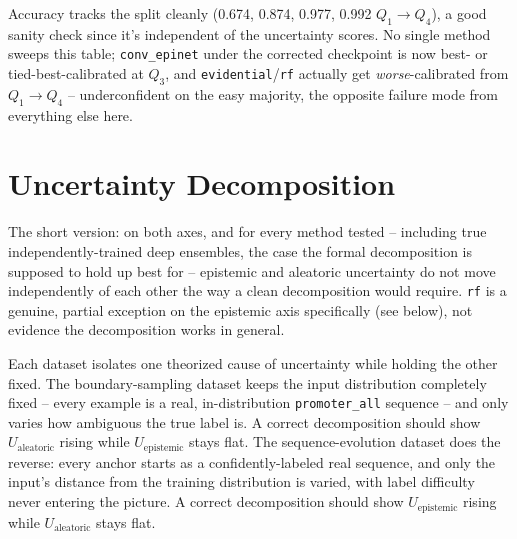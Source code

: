 Accuracy tracks the split cleanly (0.674, 0.874, 0.977, 0.992
$Q_1\to Q_4$), a good sanity check since it's independent of the
uncertainty scores. No single method sweeps this table; \texttt{conv\_epinet}
under the corrected checkpoint is now best- or tied-best-calibrated at $Q_3$,
and \texttt{evidential}/\texttt{rf} actually get \emph{worse}-calibrated
from $Q_1\to Q_4$ -- underconfident on the easy majority, the opposite
failure mode from everything else here.

\section{Uncertainty Decomposition}
\label{sec:discussion-decomposition}

The short version: on both axes, and for every method tested -- including
true independently-trained deep ensembles, the case the formal decomposition
is supposed to hold up best for -- epistemic and aleatoric uncertainty do
not move independently of each other the way a clean decomposition would
require. \texttt{rf} is a genuine, partial exception on the epistemic axis
specifically (see below), not evidence the decomposition works in general.

Each dataset isolates one theorized cause of uncertainty while holding the
other fixed. The boundary-sampling dataset keeps the input distribution
completely fixed -- every example is a real, in-distribution
\texttt{promoter\_all} sequence -- and only varies how ambiguous the true
label is. A correct decomposition should show $U_{\text{aleatoric}}$ rising
while $U_{\text{epistemic}}$ stays flat. The sequence-evolution dataset does
the reverse: every anchor starts as a confidently-labeled real sequence, and
only the input's distance from the training distribution is varied, with
label difficulty never entering the picture. A correct decomposition should
show $U_{\text{epistemic}}$ rising while $U_{\text{aleatoric}}$ stays flat.

